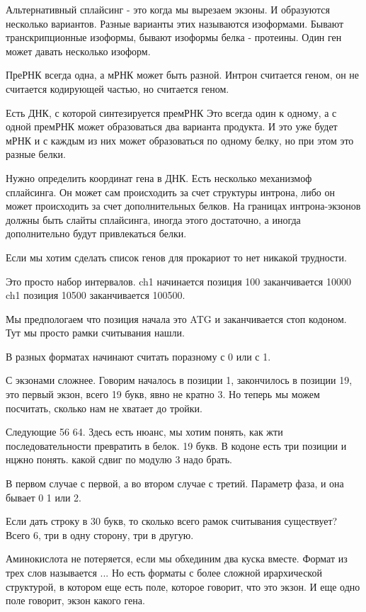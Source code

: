 Альтернативный сплайсинг - это когда мы вырезаем экзоны. И образуются несколько 
вариантов. Разные варианты этих 
называются изоформами. Бывают транскрипционные изоформы, бывают 
изоформы белка - протеины. Один ген может давать несколько изоформ. 

ПреРНК всегда одна, а мРНК может быть разной. Интрон считается геном, 
он не считается кодирующей частью, но считается геном. 

Есть ДНК, с которой синтезируется премРНК Это всегда один к одному, 
а с одной премРНК может образоваться 
два варианта продукта. И это уже будет мРНК и с каждым из них 
может образоваться по одному белку, но при этом это разные белки. 

Нужно определить координат гена в ДНК. Есть несколько механизмоф сплайсинга. 
Он может сам происходить за счет структуры интрона, либо он может происходить за счет дополнительных 
белков. На границах интрона-экзонов должны быть слайты сплайсинга, иногда
этого достаточно, а иногда дополнительно будут привлекаться белки. 


Если мы хотим сделать список генов для прокариот то нет 
никакой трудности. 

Это просто набор интервалов. 
ch1 начинается позиция 100 заканчивается 10000
ch1 позиция 10500 заканчивается 100500. 

Мы предпологаем что позиция начала это ATG и заканчивается стоп кодоном. 
Тут мы просто рамки считывания нашли. 

В разных форматах начинают считать поразному с 0 или с 1. 

С экзонами сложнее. 
Говорим началось в позиции 1, закончилось в позиции 19,
это первый экзон, всего
19 букв, явно не кратно 3. Но теперь мы можем
посчитать, сколько нам не хватает до тройки.

Следующие 56 64. Здесь есть нюанс,
мы хотим понять, как жти последовательности превратить в белок.
19 букв. В кодоне есть три позиции и нцжно понять. какой сдвиг
по модулю 3 надо брать.

В первом случае с первой, а во втором случае с третий.
Параметр фаза, и она бывает 0 1 или 2.

Если дать строку в 30 букв, то сколько всего рамок считывания существует?
Всего 6, три в одну сторону, три в другую.

Аминокислота не потеряется, если мы обхединим
два куска вместе. Формат из трех слов называется ...
Но есть форматы с более сложной ирархической структурой,
в котором еще есть поле, которое говорит, что это экзон.
И еще одно поле говорит, экзон какого гена.

